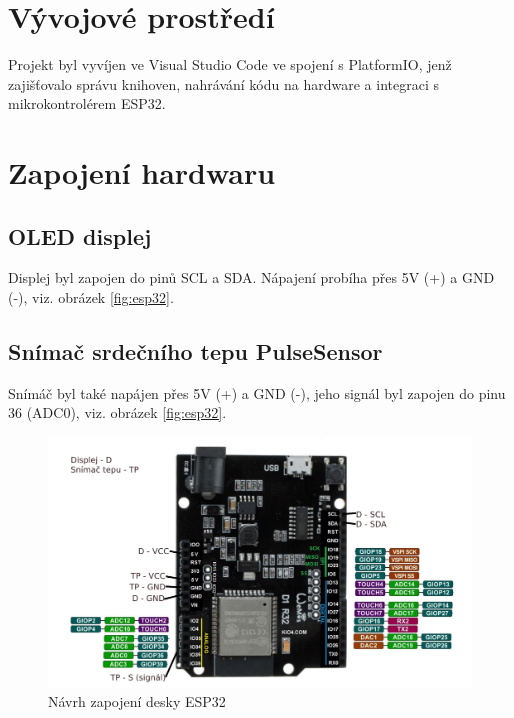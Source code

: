 \documentclass[11.5pt]{article}
\begin{document}
        \section{Vývojové prostředí}
        Projekt byl vyvíjen ve Visual Studio Code ve spojení s PlatformIO, jenž zajišťovalo správu knihoven, nahrávání kódu na hardware a integraci s mikrokontrolérem ESP32.

        \section{Zapojení hardwaru}\label{zapojeni}
        
        \subsection{OLED displej}
        Displej byl zapojen do pinů SCL a SDA. Nápajení probíha přes 5V (+) a GND (-), viz. obrázek \ref{fig:esp32}.
        \subsection{Snímač srdečního tepu PulseSensor}
        Snímáč byl také napájen přes 5V (+) a GND (-), jeho signál byl zapojen do pinu 36 (ADC0), viz. obrázek \ref{fig:esp32}.
        \begin{figure}[H]
          \centering
          \includegraphics[width=\linewidth]{pic/deska.png}
          \caption{Návrh zapojení desky ESP32}
        \end{figure}
\end{document}
